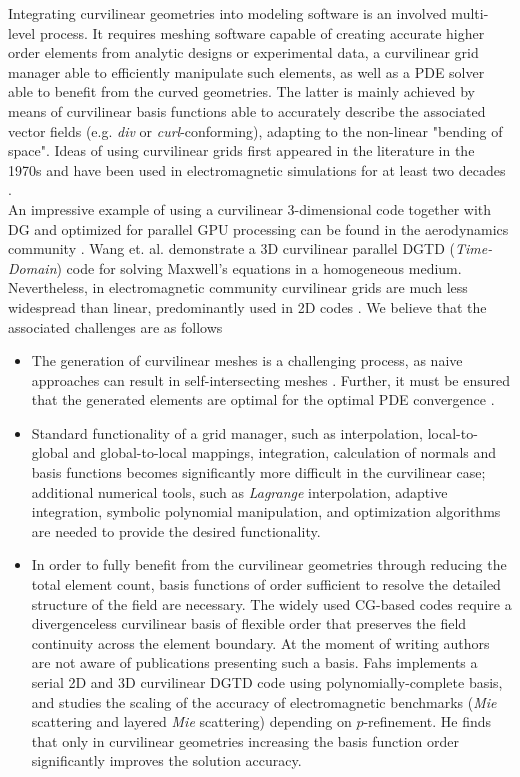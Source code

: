 
\noindent
Integrating curvilinear geometries into modeling software is an involved multi-level process. It requires meshing software capable of creating accurate higher order elements from analytic designs or experimental data, a curvilinear grid manager able to efficiently manipulate such elements, as well as a PDE solver able to benefit from the curved geometries. The latter is mainly achieved by means of curvilinear basis functions able to accurately describe the associated vector fields (e.g. \textit{div} or \textit{curl}-conforming), adapting to the non-linear "bending of space". Ideas of using curvilinear grids first appeared in the literature in the 1970s \citep{ciarlet+1972, lenoir1986} and have been used in electromagnetic simulations for at least two decades \citep{wang+1993}. \\

\noindent
An impressive example of using a curvilinear $3$-dimensional code together with DG and optimized for parallel GPU processing can be found in the aerodynamics community \cite{Warburton2012}.
Wang et. al. \cite{wang+2011} demonstrate a 3D curvilinear parallel DGTD (\textit{Time-Domain}) code for solving Maxwell's equations in a homogeneous medium.
Nevertheless, in electromagnetic community curvilinear grids are much less widespread than linear, predominantly used in 2D codes \citep{wang+2011a}.
We believe that the associated challenges are as follows
\begin{itemize}
\item The generation of curvilinear meshes is a challenging process, as naive approaches can result in self-intersecting meshes \citep{toulorge+2013, johnen+2012}. Further, it must be ensured that the generated elements are optimal for the optimal PDE convergence \cite{lenoir1986}.
\item Standard functionality of a grid manager, such as interpolation, local-to-global and global-to-local mappings, integration, calculation of normals and basis functions becomes significantly more difficult in the curvilinear case; additional numerical tools, such as \textit{Lagrange} interpolation, adaptive integration, symbolic polynomial manipulation, and optimization algorithms are needed to provide the desired functionality. 
\item In order to fully benefit from the curvilinear geometries through reducing the total element count, basis functions of order sufficient to resolve the detailed structure of the field are necessary. The widely used CG-based codes require a divergenceless curvilinear basis of flexible order that preserves the field continuity across the element boundary. At the moment of writing authors are not aware of publications presenting such a basis. Fahs\cite{fahs2011} implements a serial 2D and 3D curvilinear DGTD code using polynomially-complete basis, and studies the scaling of the accuracy of electromagnetic benchmarks (\textit{Mie} scattering and layered \textit{Mie} scattering) depending on $p$-refinement. He finds that only in curvilinear geometries increasing the basis function order significantly improves the solution accuracy.
\end{itemize}

